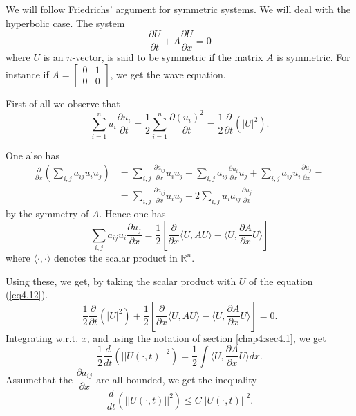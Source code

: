 We will follow Friedrichs' argument for symmetric systems. We will
deal with the hyperbolic case. The system
\begin{equation*}
\frac{\partial U}{\partial t} + A \frac{\partial U}{\partial x} =0
\tag{4.12}\label{eq4.12}
\end{equation*}
where $U$ is an $n$-vector, is said to be symmetric if the matrix $A$
is symmetric. For  instance if
 $A = \begin{bmatrix}
0 & 1\\
0 & 0
\end{bmatrix}$, we get the wave equation. 

First of all we observe that 
\begin{equation*}
\sum\limits^n_{i=1} u_i \frac{\partial u_i}{\partial t} = \frac{1}{2}
\sum\limits^n_{i=1} \frac{\partial (u_i)^2}{\partial t} = \frac{1}{2}
\frac{\partial}{\partial t} (|U|^2). \tag{4.13}\label{eq4.13}
\end{equation*}

One also has
\begin{align*}
\frac{\partial}{\partial x} \left(\sum\limits_{i,j} a_{ij} u_i u_j\right) &
=\sum\limits_{i,j} \frac{\partial a_{ij}}{\partial x} u_i u_j +
\sum\limits_{i,j} a_{ij} \frac{\partial u_i}{\partial x} u_j +
\sum\limits_{i,j} a_{ij} u_i \frac{\partial u_j}{\partial x} = \\
& = \sum\limits_{i,j} \frac{\partial a_{ij}}{\partial x} u_i u_j + 2
\sum\limits_{i,j} u_i a_{ij} \frac{\partial u_j}{\partial x}
\end{align*}
by the symmetry of $A$. Hence one has 
\begin{equation*}
\sum\limits_{i,j} a_{ij} u_i \frac{\partial u_j}{\partial x} =
\frac{1}{2} \left[\frac{\partial}{\partial x} \langle U, AU\rangle -
  \langle U, \frac{\partial A}{\partial x} U \rangle \right] \tag{4.14}\label{eq4.14}
\end{equation*}
where $\langle \cdot, \cdot \rangle$ denotes the scalar product in
$\mathbb{R}^n$.

Using these, we get, by taking the scalar product with $U$ of the
equation (\ref{eq4.12}). 
\begin{equation*}
\frac{1}{2} \frac{\partial}{\partial t} (|U|^2) + \frac{1}{2}
\left[\frac{\partial}{\partial x} \langle U, A U\rangle  - \langle U,
  \frac{\partial A}{\partial x} U\rangle\right] = 0. \tag{4.15}\label{eq4.15}
\end{equation*}
Integrating w.r.t. $x$, and using the notation of section \ref{chap4:sec4.1}, we get
\begin{equation*}
\frac{1}{2} \frac{d}{dt} (|| U (\cdot, t)||^2) = \frac{1}{2} \int
\langle U, \frac{\partial A}{\partial x} U \rangle dx. \tag{4.16}\label{eq4.16}
\end{equation*}
Assume\pageoriginale that the $\dfrac{\partial a_{ij}}{\partial x}$
are all bounded, we get the inequality
\begin{equation*}
\frac{d}{dt} (||U (\cdot, t)||^2) \leq C ||U(\cdot, t)||^2.
\tag{4.17}\label{eq4.17}
\end{equation*}

